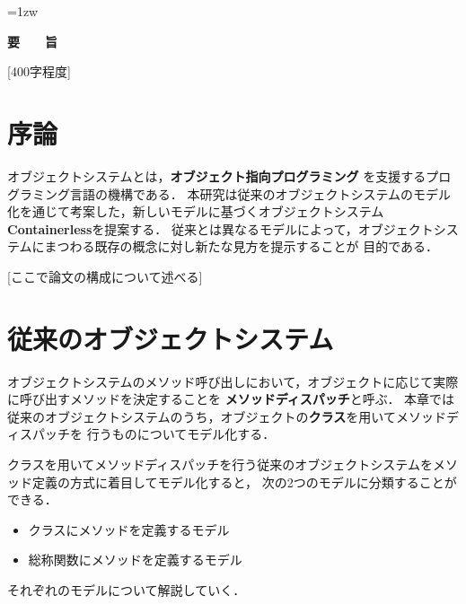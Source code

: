 \documentclass[a4paper,11pt,dvipdfmx]{jreport}
\title{\Underline{Containerless：オブジェクトシステムの新しいとらえ方}}
\author{林 拓人}
\begin{document}
\maketitle
\thispagestyle{empty}
\newpage

\thispagestyle{empty}
\vspace*{20pt plus 1fil}
\parindent=1zw
\noindent
\begin{center}
{\Large \bf 要　　旨}
\vspace{2cm}
\end{center}
[400字程度]

\par
\vspace{0pt plus 1fil}
\newpage

\tableofcontents
\listoffigures

\pagebreak \setcounter{page}{1}


\chapter{序論}

オブジェクトシステムとは，\textbf{オブジェクト指向プログラミング}\cite{Stroustrup:1988:OP:624569.624721}
を支援するプログラミング言語の機構である．
本研究は従来のオブジェクトシステムのモデル化を通じて考案した，新しいモデルに基づくオブジェクトシステム
\textbf{Containerless}を提案する．
従来とは異なるモデルによって，オブジェクトシステムにまつわる既存の概念に対し新たな見方を提示することが
目的である．

[ここで論文の構成について述べる]


\chapter{従来のオブジェクトシステム}

オブジェクトシステムのメソッド呼び出しにおいて，オブジェクトに応じて実際に呼び出すメソッドを決定することを
\textbf{メソッドディスパッチ}と呼ぶ．
本章では従来のオブジェクトシステムのうち，オブジェクトの\textbf{クラス}を用いてメソッドディスパッチを
行うものについてモデル化する．

クラスを用いてメソッドディスパッチを行う従来のオブジェクトシステムをメソッド定義の方式に着目してモデル化すると，
次の2つのモデルに分類することができる．
\begin{itemize}
	\item クラスにメソッドを定義するモデル
	\item 総称関数にメソッドを定義するモデル
\end{itemize}
それぞれのモデルについて解説していく．
\end{document}
